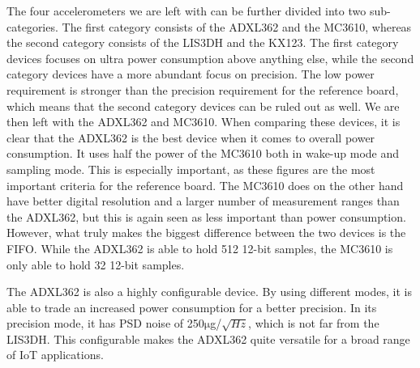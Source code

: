 The four accelerometers we are left with can be further divided into two sub-categories. The first category consists of the ADXL362 and the MC3610, whereas the second category consists of the LIS3DH and the KX123. The first category devices focuses on ultra power consumption above anything else, while the second category devices have a more abundant focus on precision. The low power requirement is stronger than the precision requirement for the reference board, which means that the second category devices can be ruled out as well. We are then left with the ADXL362 and MC3610. When comparing these devices, it is clear that the ADXL362 is the best device when it comes to overall power consumption. It uses half the power of the MC3610 both in wake-up mode and sampling mode. This is especially important, as these figures are the most important criteria for the reference board. The MC3610 does on the other hand have better digital resolution and a larger number of measurement ranges than the ADXL362, but this is again seen as less important than power consumption. However, what truly makes the biggest difference between the two devices is the FIFO. While the ADXL362 is able to hold 512 12-bit samples, the MC3610 is only able to hold 32 12-bit samples.

The ADXL362 is also a highly configurable device. By using different modes, it is able to trade an increased power consumption for a better precision. In its precision mode, it has PSD noise of 250$\si{\micro}$g/$\sqrt{Hz}$, which is not far from the LIS3DH. This configurable makes the ADXL362 quite versatile for a broad range of IoT applications.